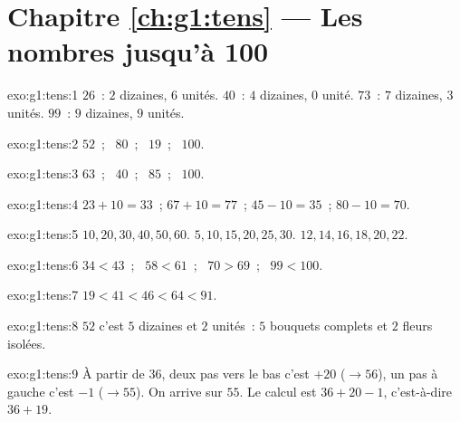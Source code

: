 \section*{Chapitre \ref{ch:g1:tens} --- Les nombres jusqu'à 100}

\begin{solution}{exo:g1:tens:1}
$26$~: $2$ dizaines, $6$ unités. $40$~: $4$ dizaines, $0$ unité.
$73$~: $7$ dizaines, $3$ unités. $99$~: $9$ dizaines, $9$ unités.
\end{solution}

\begin{solution}{exo:g1:tens:2}
$52$~; \ $80$~; \ $19$~; \ $100$.
\end{solution}

\begin{solution}{exo:g1:tens:3}
$63$~; \ $40$~; \ $85$~; \ $100$.
\end{solution}

\begin{solution}{exo:g1:tens:4}
$23 + 10 = 33$~; \quad $67 + 10 = 77$~; \quad $45 - 10 = 35$~; \quad
$80 - 10 = 70$.
\end{solution}

\begin{solution}{exo:g1:tens:5}
$10, 20, 30, 40, 50, 60$. \quad $5, 10, 15, 20, 25, 30$. \quad
$12, 14, 16, 18, 20, 22$.
\end{solution}

\begin{solution}{exo:g1:tens:6}
$34 < 43$~; \ $58 < 61$~; \ $70 > 69$~; \ $99 < 100$.
\end{solution}

\begin{solution}{exo:g1:tens:7}
$19 < 41 < 46 < 64 < 91$.
\end{solution}

\begin{solution}{exo:g1:tens:8}
$52$ c'est $5$ dizaines et $2$ unités~: $5$ bouquets complets et
$2$ fleurs isolées.
\end{solution}

\begin{solution}{exo:g1:tens:9}
À partir de $36$, deux pas vers le bas c'est $+20$ ($\to 56$), un
pas à gauche c'est $-1$ ($\to 55$). On arrive sur $55$. Le calcul
est $36 + 20 - 1$, c'est-à-dire $36 + 19$.
\end{solution}
